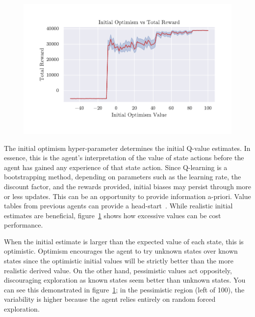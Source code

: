 \documentclass[]{final_report}
\begin{document}
\begin{figure}[H]
  \centering
  
  \includegraphics[trim={0 1cm 0 1cm},clip, width=\textwidth]{hyper-paramiters/inital-optimism}
  
  \caption{\label{fig:inital-optimism}}
\end{figure}


The initial optimism hyper-parameter determines the initial Q-value estimates. In essence, this is the agent's interpretation of the value of state actions before the agent has gained any experience of that state action. Since Q-learning is a bootstrapping method, depending on parameters such as the learning rate, the discount factor, and the rewards provided, initial biases may persist through more or less updates. This can be an opportunity to provide information a-priori. Value tables from previous agents can provide a head-start~\cite{deathTransfer}. While realistic initial estimates are beneficial, figure~\ref{fig:inital-optimism} shows how excessive values can be cost performance. 

When the initial estimate is larger than the expected value of each state, this is optimistic. Optimism encourages the agent to try unknown states over known states since the optimistic initial values will be strictly better than the more realistic derived value. On the other hand, pessimistic values act oppositely, discouraging exploration as known states seem better than unknown states. You can see this demonstrated in figure~\ref{fig:inital-optimism}; in the pessimistic region (left of 100), the variability is higher because the agent relies entirely on random forced exploration. 
\end{document}
